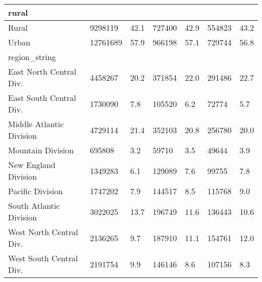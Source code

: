\begin{longtable}{lllllll}
\midrule
\multicolumn{1}{l}{rural} \\ 
\midrule
Rural & 9298119 & 42.1 & 727400 & 42.9 & 554823 & 43.2 \\ 
Urban & 12761689 & 57.9 & 966198 & 57.1 & 729744 & 56.8 \\ 
\midrule
\multicolumn{1}{l}{region\_string} \\ 
\midrule
East North Central Div. & 4458267 & 20.2 & 371854 & 22.0 & 291486 & 22.7 \\ 
East South Central Div. & 1730090 & 7.8 & 105520 & 6.2 & 72774 & 5.7 \\ 
Middle Atlantic Division & 4729114 & 21.4 & 352103 & 20.8 & 256780 & 20.0 \\ 
Mountain Division & 695808 & 3.2 & 59710 & 3.5 & 49644 & 3.9 \\ 
New England Division & 1349283 & 6.1 & 129089 & 7.6 & 99755 & 7.8 \\ 
Pacific Division & 1747202 & 7.9 & 144517 & 8.5 & 115768 & 9.0 \\ 
South Atlantic Division & 3022025 & 13.7 & 196749 & 11.6 & 136443 & 10.6 \\ 
West North Central Div. & 2136265 & 9.7 & 187910 & 11.1 & 154761 & 12.0 \\ 
West South Central Div. & 2191754 & 9.9 & 146146 & 8.6 & 107156 & 8.3 \\ 
\bottomrule
\end{longtable}

